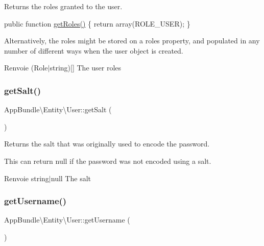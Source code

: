 Returns the roles granted to the user.

{\ttfamily  public function \hyperlink{classAppBundle_1_1Entity_1_1User_a7feac9233be86c6fd93280a891905a2b}{get\+Roles()} \{ return array(\textquotesingle{}R\+O\+L\+E\+\_\+\+U\+S\+ER\textquotesingle{}); \} }

Alternatively, the roles might be stored on a {\ttfamily roles} property, and populated in any number of different ways when the user object is created.

\begin{DoxyReturn}{Renvoie}
(Role$\vert$string)\mbox{[}\mbox{]} The user roles 
\end{DoxyReturn}
\mbox{\label{classAppBundle_1_1Entity_1_1User_a5c4b12b13068e7e0ff2fe3e773ef16ee}} 
\subsubsection{\texorpdfstring{get\+Salt()}{getSalt()}}
{\footnotesize\ttfamily App\+Bundle\textbackslash{}\+Entity\textbackslash{}\+User\+::get\+Salt (\begin{DoxyParamCaption}{ }\end{DoxyParamCaption})}

Returns the salt that was originally used to encode the password.

This can return null if the password was not encoded using a salt.

\begin{DoxyReturn}{Renvoie}
string$\vert$null The salt 
\end{DoxyReturn}
\mbox{\label{classAppBundle_1_1Entity_1_1User_abfb46cc3484bde6475517e11fc39688e}} 
\subsubsection{\texorpdfstring{get\+Username()}{getUsername()}}
{\footnotesize\ttfamily App\+Bundle\textbackslash{}\+Entity\textbackslash{}\+User\+::get\+Username (\begin{DoxyParamCaption}{ }\end{DoxyParamCaption})}

